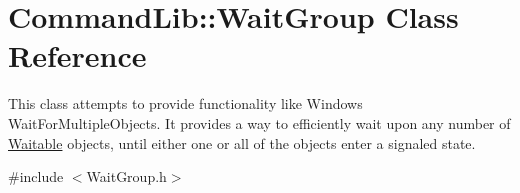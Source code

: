 \hypertarget{class_command_lib_1_1_wait_group}{}\section{Command\+Lib\+:\+:Wait\+Group Class Reference}
\label{class_command_lib_1_1_wait_group}


This class attempts to provide functionality like Windows\textquotesingle{} Wait\+For\+Multiple\+Objects. It provides a way to efficiently wait upon any number of \mbox{\hyperlink{class_command_lib_1_1_waitable}{Waitable}} objects, until either one or all of the objects enter a signaled state.  




{\ttfamily \#include $<$Wait\+Group.\+h$>$}

